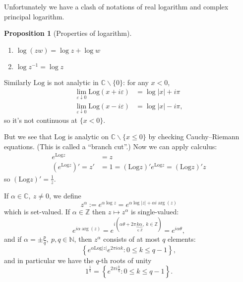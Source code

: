 \documentclass[a4paper]{article}
\newcommand{\Log}{\text{Log}}
\theoremstyle{definition}
\newtheorem{prop}[defn]{Proposition}
\begin{document}
Unfortunately we have a clash of notations of real logarithm and complex principal logarithm.
\begin{prop}[Properties of logarithm]
\begin{enumerate}
    \item $\log(zw) = \log z+ \log w$
    \item $\log z^{-1} = \log z$
\end{enumerate}
\end{prop}
Similarly $\Log$ is not analytic in $\mathbb C\backslash\{0\}$: for any $x<0$,
\[
\begin{aligned}
\lim_{\varepsilon\downarrow 0} \Log (x+ i\varepsilon)&=\log |x|+i\pi \\
\lim_{\varepsilon\downarrow 0} \Log (x- i\varepsilon)&=\log |x|-i\pi ,
\end{aligned}
\]
so it's not continuous at $\{x<0\}$.

\begin{center}
\end{center}

But we see that $\Log$ is analytic on $\mathbb C \backslash \{ x\leq 0 \}$ by checking Cauchy–Riemann equations. (This is called a ``branch cut''.) Now we can apply calculus:
\[
\begin{aligned}
e^{\Log z} &= z \\
\left(e^{\Log z}\right)' = z' &= 1 = (\Log z)' e^{\Log z} = (\Log z)' z
\end{aligned}
\]
so $\displaystyle (\Log z)'=\frac1z$.

If $\alpha \in \mathbb C,\ z\neq 0$, we define
\[
z^\alpha := e^{\alpha \log z} = e^{\alpha \log |z| + \alpha i \arg (z)}
\]
which is set-valued. If $\alpha \in \mathbb Z$ then $z\mapsto z^\alpha$ is single-valued:
\[
e^{i\alpha \arg(z)} = e^{i (\alpha \theta+2\pi \underbrace{k \alpha}_{\in\mathbb Z},\ k\in \mathbb Z)} = e^{i\alpha \theta} ,
\]
and if $\alpha = \pm \frac{p}{q},\ p,q\in \mathbb N$, then $z^\alpha$ consists of at most $q$ elements:
\[
\left\{e^{\alpha \Log |z|} e^{2\pi i \alpha k}:0\leq k\leq q-1\right\},
\]
and in particular we have the $q$-th roots of unity
\[
1^{\frac{1}{q}} = \left\{e^{2\pi i \frac{k}{q}}:0\leq k\leq q-1\right\}.
\]
\end{document}
